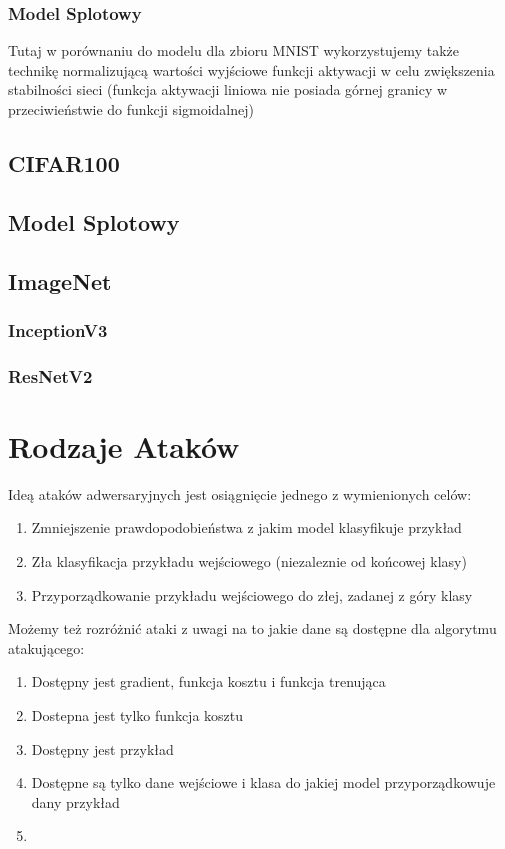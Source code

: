 \documentclass{article}
\begin{document}
        \subsubsection{Model Splotowy}
        Tutaj w porównaniu do modelu dla zbioru MNIST wykorzystujemy także technikę normalizującą wartości wyjściowe
        funkcji aktywacji w celu zwiększenia stabilności sieci (funkcja aktywacji liniowa nie posiada górnej granicy w
        przeciwieństwie do funkcji sigmoidalnej)

    \subsection{CIFAR100}
        \subsection{Model Splotowy}


    \subsection{ImageNet}
        \subsubsection{InceptionV3}
        \subsubsection{ResNetV2}




\section{Rodzaje Ataków}
Ideą ataków adwersaryjnych  jest osiągnięcie jednego z wymienionych celów:
\begin{enumerate}
    \item Zmniejszenie prawdopodobieństwa z jakim model klasyfikuje przykład
    \item Zła klasyfikacja przykładu wejściowego (niezaleznie od końcowej klasy)
    \item Przyporządkowanie przykładu wejściowego do złej, zadanej z góry klasy
\end{enumerate}

Możemy też rozróżnić ataki z uwagi na to jakie dane są dostępne dla algorytmu atakującego:
\begin{enumerate}
    \item Dostępny jest gradient, funkcja kosztu i funkcja trenująca
    \item Dostepna jest tylko funkcja kosztu
    \item Dostępny jest przykład
    \item Dostępne są tylko dane wejściowe i klasa do jakiej model przyporządkowuje dany przykład
    \item {}
\end{enumerate}
\end{document}
